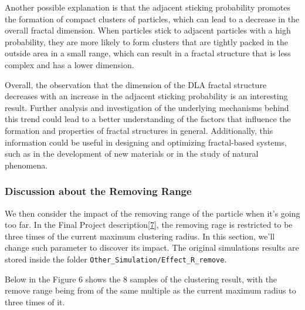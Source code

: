 \documentclass[10pt]{article}
\begin{document}
Another possible explanation is that the adjacent sticking probability promotes the formation of compact clusters of particles, which can lead to a decrease in the overall fractal dimension. When particles stick to adjacent particles with a high probability, they are more likely to form clusters that are tightly packed in the outside area in a small range, which can result in a fractal structure that is less complex and has a lower dimension.

Overall, the observation that the dimension of the DLA fractal structure decreases with an increase in the adjacent sticking probability is an interesting result. Further analysis and investigation of the underlying mechanisms behind this trend could lead to a better understanding of the factors that influence the formation and properties of fractal structures in general. Additionally, this information could be useful in designing and optimizing fractal-based systems, such as in the development of new materials or in the study of natural phenomena.

\subsubsection{Discussion about the Removing Range}

We then consider the impact of the removing range of the particle when it's going too far. In the Final Project description\hyperref[ref7]{[7]}, the removing rage is restricted to be three times of the current maximum clustering radius. In this section, we'll change such parameter to discover its impact. The original simulations results are stored inside the folder \texttt{Other\_Simulation/Effect\_R\_remove}.

Below in the Figure 6 shows the 8 samples of the clustering result, with the remove range being from of the same multiple as the current maximum radius to three times of it.

\newpage
\end{document}
